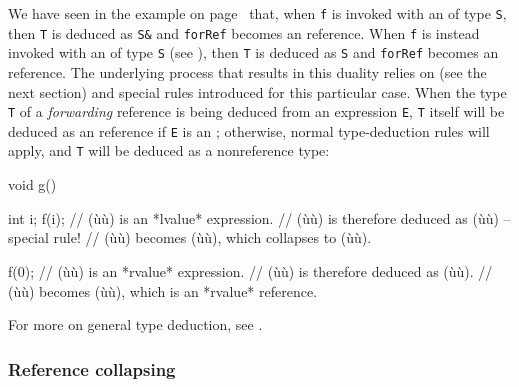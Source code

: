 \noindent We have seen in the example on page~\pageref{f-invoked-example} that,
when \lstinline!f! is invoked with an
 of type \lstinline!S!, then \lstinline!T! is deduced as
\lstinline!S&! and \lstinline!forRef! becomes an  reference.
When \lstinline!f! is instead invoked with an  of type
\lstinline!S! (see ), then \lstinline!T! is deduced as \lstinline!S! and
\lstinline!forRef! becomes an  reference. 
The underlying process that results in this duality relies on  (see the next section) and special  rules introduced for this particular case.  
When the type \lstinline!T! of a
\emph{forwarding} reference is being deduced from an expression
\lstinline!E!, \lstinline!T! itself will be deduced as an 
reference if \lstinline!E! is an ; otherwise, normal
type-deduction rules will apply, and \lstinline!T! will be deduced as a nonreference type:

\begin{emcppslisting}[emcppsbatch=e3]
void g()
{
    int i;
    f(i);  // (ù{}ù) is an *lvalue* expression.
           // (ù{}ù) is therefore deduced as (ù{}ù) -- special rule!
           // (ù{}ù) becomes (ù{}ù), which collapses to (ù{}ù).

    f(0);  // (ù{}ù) is an *rvalue* expression.
           // (ù{}ù) is therefore deduced as (ù{}ù).
           // (ù{}ù) becomes (ù{}ù), which is an *rvalue* reference.
}
\end{emcppslisting}

\noindent For more on general type deduction, see .

\subsubsection[Reference collapsing]{Reference collapsing}\label{reference-collapsing}

